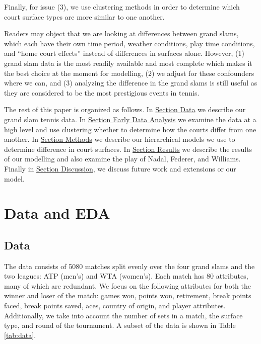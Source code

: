 \documentclass[]{article}
\begin{document}
Finally, for issue (3), we use clustering methods in order to determine
which court surface types are more similar to one another.

Readers may object that we are looking at differences between grand
slams, which each have their own time period, weather conditions, play
time conditions, and ``home court effects'' instead of differences in
surfaces alone. However, (1) grand slam data is the most readily
available and most complete which makes it the best choice at the moment
for modelling, (2) we adjust for these confounders where we can, and (3)
analyzing the difference in the grand slams is still useful as they are
considered to be the most prestigious events in tennis.

The rest of this paper is organized as follows. In
\protect\hyperlink{sec:data}{Section Data} we describe our grand slam
tennis data. In \protect\hyperlink{sec:eda}{Section Early Data Analysis}
we examine the data at a high level and use clustering whether to
determine how the courts differ from one another. In
\protect\hyperlink{sec:methods}{Section Methods} we describe our
hierarchical models we use to determine difference in court surfaces. In
\protect\hyperlink{sec:results}{Section Results} we describe the results
of our modelling and also examine the play of Nadal, Federer, and
Williams. Finally in \protect\hyperlink{discussion}{Section Discussion},
we discuss future work and extensions or our model.

\hypertarget{sec:data-eda}{%
\section{Data and EDA}\label{sec:data-eda}}

\hypertarget{sec:data}{%
\subsection{Data}\label{sec:data}}

The data consists of 5080 matches split evenly over the four grand slams
and the two leagues: ATP (men's) and WTA (women's). Each match has 80
attributes, many of which are redundant. We focus on the following
attributes for both the winner and loser of the match: games won, points
won, retirement, break points faced, break points saved, aces, country
of origin, and player attributes. Additionally, we take into account the
number of sets in a match, the surface type, and round of the
tournament. A subset of the data is shown in Table \ref{tab:data}.
\end{document}
